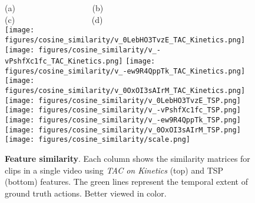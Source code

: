 \documentclass[10pt,twocolumn,letterpaper]{article}
\begin{document}
\begin{figure}[t]
    \centering
    (a)~~~~~~~~~~~~~~~~~~
    (b)~~~~~~~~~~~~~~~~~~
    (c)~~~~~~~~~~~~~~~~~~
    (d)\\
    \texttt{[image: figures/cosine\_similarity/v\_0LebHO3TvzE\_TAC\_Kinetics.png]}
    \texttt{[image: figures/cosine\_similarity/v\_-vPshfXc1fc\_TAC\_Kinetics.png]}
    \texttt{[image: figures/cosine\_similarity/v\_-ew9R4QppTk\_TAC\_Kinetics.png]}
    \texttt{[image: figures/cosine\_similarity/v\_0OxOI3sAIrM\_TAC\_Kinetics.png]} 
    \\
    \texttt{[image: figures/cosine\_similarity/v\_0LebHO3TvzE\_TSP.png]}
    \texttt{[image: figures/cosine\_similarity/v\_-vPshfXc1fc\_TSP.png]}
    \texttt{[image: figures/cosine\_similarity/v\_-ew9R4QppTk\_TSP.png]}
    \texttt{[image: figures/cosine\_similarity/v\_0OxOI3sAIrM\_TSP.png]}
    \\
    \texttt{[image: figures/cosine\_similarity/scale.png]}
    \vspace{-5pt}
    \caption{\textbf{Feature similarity}. Each column shows the similarity matrices for clips in a single video using \textit{TAC on Kinetics} (top) and TSP (bottom) features. The green lines represent the temporal extent of ground truth actions. Better viewed in color.}
    \vspace{-5pt}
    \label{fig:cosine_similarity}
\end{figure}
\end{document}
